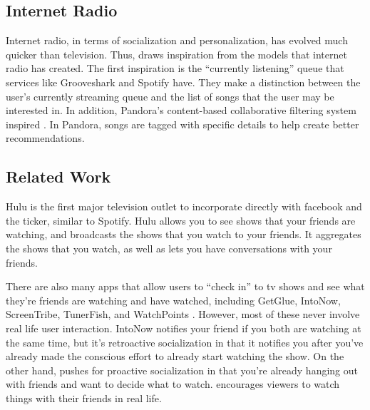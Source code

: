 \subsection{Internet Radio}
Internet radio, in terms of socialization and personalization, has
evolved much quicker than television.  Thus, {\sys} draws inspiration
from the models that internet radio has created.  The first
inspiration is the “currently listening” queue that services like
Grooveshark \cite{grooveshark} and Spotify \cite{spotify} have.  They
make a distinction between the user’s currently streaming queue and
the list of songs that the user may be interested in.  In addition,
Pandora’s \cite{pandora} content-based collaborative filtering system
inspired {\sys}.  In Pandora, songs are tagged with specific details
to help create better recommendations.

\subsection{Related Work}
Hulu is the first major television outlet to incorporate directly with
facebook and the ticker, similar to Spotify.  Hulu allows you to see
shows that your friends are watching, and broadcasts the shows that
you watch to your friends.  It aggregates the shows that you watch, as
well as lets you have conversations with your friends.

There are also many apps that allow users to “check in” to tv shows
and see what they’re friends are watching and have watched, including
GetGlue, IntoNow, ScreenTribe, TunerFish, and WatchPoints
\cite{chausse}.  However, most of these never involve real life user
interaction.  IntoNow notifies your friend if you both are watching at
the same time, but it’s retroactive socialization in that it notifies
you after you’ve already made the conscious effort to already start
watching the show.  On the other hand, {\sys} pushes for proactive
socialization in that you’re already hanging out with friends and want
to decide what to watch.  {\sys} encourages viewers to watch things
with their friends in real life.
